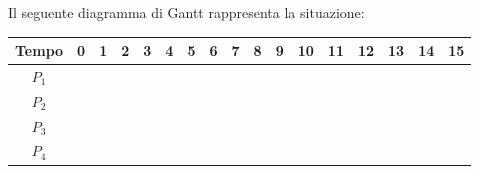\documentclass[a4paper]{article}
\begin{document}
Il seguente diagramma di Gantt rappresenta la situazione:

\begin{table}[h!]
    \centering
    \begin{tabular}{ |c|rlrlrrlrlllr|l|l|l|l| }
        \hline
        Tempo & \multicolumn{1}{l|}{0}                       & \multicolumn{1}{l|}{1}                        & \multicolumn{1}{l|}{2}                        & \multicolumn{1}{l|}{3}                       & \multicolumn{1}{l|}{4} & \multicolumn{1}{l|}{5} & \multicolumn{1}{l|}{6} & \multicolumn{1}{l|}{7} & \multicolumn{1}{l|}{8} & \multicolumn{1}{l|}{9} & \multicolumn{1}{l|}{10} & \multicolumn{1}{l|}{11} & 12 & 13 & 14 & 15 \\ \hline
        $P_1$ & \multicolumn{2}{r}{\cellcolor[HTML]{656565}} & \multicolumn{9}{r}{}                          & \multicolumn{5}{r|}{\cellcolor[HTML]{656565}}                                                                                                                                                                                                                                                                              \\ \hline
        $P_2$ & \multicolumn{2}{r}{}                         & \multicolumn{2}{r}{\cellcolor[HTML]{656565}}  & \multicolumn{1}{r|}{}                         & \multicolumn{2}{r}{\cellcolor[HTML]{656565}} & \multicolumn{9}{r|}{}                                                                                                                                                                                                       \\ \hline
        $P_3$ & \multicolumn{4}{r}{}                         & \multicolumn{1}{r|}{\cellcolor[HTML]{656565}} & \multicolumn{11}{r|}{}                                                                                                                                                                                                                                                                                                     \\ \hline
        $P_4$ & \multicolumn{7}{r}{}                         & \multicolumn{4}{r}{\cellcolor[HTML]{656565}}  & \multicolumn{5}{r|}{}                                                                                                                                                                                                                                                                                                      \\ \hline
    \end{tabular}
\end{table}
\end{document}

